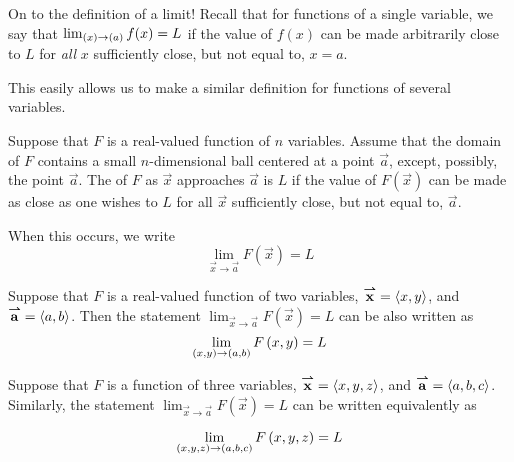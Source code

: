 \documentclass{ximera}
\begin{document}
On to the definition of a limit!
Recall that for functions of a single variable, we say that $\lim_{\left(x\right) \to \left(a\right)} f(x) = L$ if the value of $f(x)$ can be made arbitrarily close to $L$ for \emph{all} $x$ sufficiently close, but not equal to, $x=a$.

This easily allows us to make a similar definition for functions of several variables.

\begin{definition}
 Suppose that $F$ is a real-valued function of $n$ variables. Assume that the domain of $F$ contains a small $n$-dimensional ball centered at a point $\vec{a}$, except, possibly, the point $\vec{a}$.
  The  of $F$ as $\vec{x}$ approaches $\vec{a}$ is $L$ if the value of $F(\vec{x})$ can be made as close as one wishes to $L$ for all $\vec{x}$ sufficiently close, but not equal to, $\vec{a}$.
 
 When this occurs, we write 
 \[
 \lim_{\vec{x}\to \vec{a}} F(\vec{x}) = L
 \]  
\end{definition}

 \begin{remark}   
  Suppose that $F$ is a real-valued function of two variables, ${\overset{\boldsymbol{\rightharpoonup}}{\mathbf{x}}}\hspace{0in} = \left\langle x,y\right\rangle$, and ${\overset{\boldsymbol{\rightharpoonup}}{\mathbf{a}}}\hspace{0in} =
  \left\langle a,b\right\rangle$. 
  Then the statement $ \lim_{\vec{x}\to \vec{a}} F(\vec{x}) = L$ can be also written as
    \[
    \lim_{\left(x,y\right)\to \left(a,b\right) }F\left(x,y\right) = L
    \]
\end{remark}
  \begin{remark}
    Suppose that $F$ is a function of three variables, ${\overset{\boldsymbol{\rightharpoonup}}{\mathbf{x}}}\hspace{0in} = \left\langle x,y,z\right\rangle$, and
    ${\overset{\boldsymbol{\rightharpoonup}}{\mathbf{a}}}\hspace{0in} = \left\langle a,b,c\right\rangle$. Similarly, the statement 
    $ \lim_{\vec{x}\to \vec{a}} F(\vec{x}) = L$ can be written equivalently as

      \[
      \lim_{\left(x,y,z\right)\to \left(a,b,c\right)} F\left(x,y,z\right) = L
      \]


\end{remark}
\end{document}
